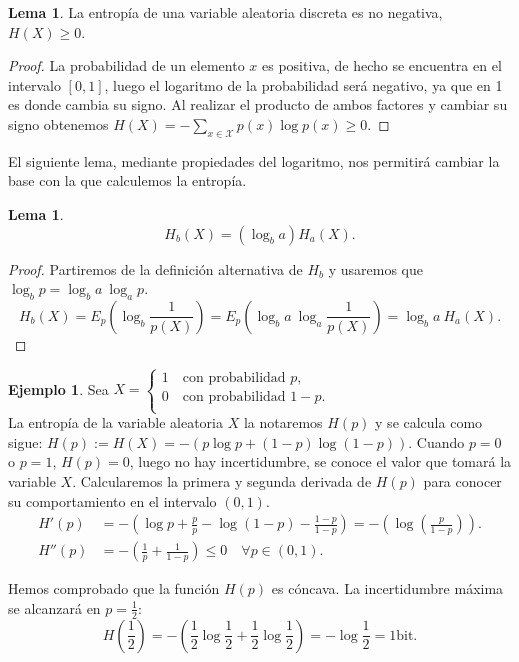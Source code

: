 \documentclass[10pt,a4paper]{article} %
\theoremstyle{definition}
\newtheorem{lemma}[theorem]{Lema}
\newtheorem{example}[theorem]{Ejemplo}
\begin{document}
\begin{lemma} La entropía de una variable aleatoria discreta es no negativa, $H(X) \ge 0$.
\end{lemma}
\begin{proof}
  La probabilidad de un elemento $x$ es positiva, de hecho se encuentra en el intervalo $[0,1]$, luego el logaritmo de la probabilidad será negativo, ya que en 1 es donde cambia su signo. Al realizar el producto de ambos factores y cambiar su signo obtenemos $H(X) = - \sum_{x \in \mathcal{X}}p(x)\log p(x) \ge 0$.

\end{proof}

El siguiente lema, mediante propiedades del logaritmo, nos permitirá cambiar la base con la que calculemos la entropía.

\begin{lemma}\[H_b(X) = (\log_ba) H_a(X).\]
\end{lemma}
\begin{proof}
  Partiremos de la definición alternativa de $H_b$ y usaremos que $\log_bp = \log_ba\ \log_ap$.
  \[
  H_b(X) = E_p \left(\log_b \frac{1}{p(X)}\right ) = E_p \left ( \log_b a\ \log_a \frac{1}{p(X)} \right ) = \log_b{a}\ H_a(X).
  \]
\end{proof}

\begin{example}
  Sea $X = 
     \begin{cases}
       1 \quad\text{con probabilidad } p,\\
       0 \quad\text{con probabilidad } 1-p. \\
     \end{cases}$\\
     La entropía de la variable aleatoria $X$ la notaremos $H(p)$ y se calcula como sigue: $ H(p) := H(X) = - \left ( p \log p + (1-p) \log (1-p) \right )$.
     Cuando $p=0$ o $p=1$, $H(p) = 0$, luego no hay incertidumbre, se conoce el valor que tomará la variable $X$. Calcularemos la primera y segunda derivada de $H(p)$ para conocer su comportamiento en el intervalo $(0,1)$.
     \begin{align*}
       H'(p) &= - \left ( \log p + \frac{p}{p} - \log(1-p) - \frac{1-p}{1-p} \right ) = - \left ( \log \left (\frac{p}{1-p} \right) \right ).\\
     H''(p) &= - \left ( \frac{1}{p} + \frac{1}{1-p} \right ) \leq 0 \quad \forall p \in (0,1).
     \end{align*}
     
     Hemos comprobado que la función $H(p)$ es cóncava. La incertidumbre máxima se alcanzará en $p=\frac{1}{2}$: \[H\left (\frac{1}{2}\right ) = - \left ( \frac{1}{2}\log\frac{1}{2} + \frac{1}{2} \log\frac{1}{2} \right ) = - \log \frac{1}{2} = 1 \text{bit}.\]

\end{example}
\end{document}
